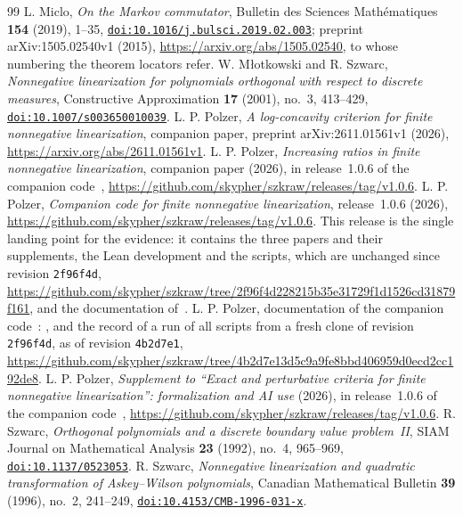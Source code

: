 \begin{thebibliography}{99}
 L. Miclo, \emph{On the Markov commutator}, Bulletin des Sciences Math\'ematiques \textbf{154} (2019), 1--35, \href{https://doi.org/10.1016/j.bulsci.2019.02.003}{\nolinkurl{doi:10.1016/j.bulsci.2019.02.003}}; preprint arXiv:1505.02540v1 (2015), \url{https://arxiv.org/abs/1505.02540}, to whose numbering the theorem locators refer.
 W. M{\l}otkowski and R. Szwarc, \emph{Nonnegative linearization for polynomials orthogonal with respect to discrete measures}, Constructive Approximation \textbf{17} (2001), no.~3, 413--429, \href{https://doi.org/10.1007/s003650010039}{\nolinkurl{doi:10.1007/s003650010039}}.
 L. P. Polzer, \emph{A log-concavity criterion for finite nonnegative linearization}, companion paper, preprint arXiv:2611.01561v1 (2026), \url{https://arxiv.org/abs/2611.01561v1}.
 L. P. Polzer, \emph{Increasing ratios in finite nonnegative linearization}, companion paper (2026), in release~1.0.6 of the companion code~\cite{code}, \url{https://github.com/skypher/szkraw/releases/tag/v1.0.6}.
 L. P. Polzer, \emph{Companion code for finite nonnegative linearization}, release~1.0.6 (2026), \url{https://github.com/skypher/szkraw/releases/tag/v1.0.6}. This release is the single landing point for the evidence: it contains the three papers and their supplements, the Lean development and the scripts, which are unchanged since revision \texttt{2f96f4d}, \url{https://github.com/skypher/szkraw/tree/2f96f4d228215b35e31729f1d1526cd31879f161}, and the documentation of~\cite{docs}.
 L. P. Polzer, documentation of the companion code~\cite{code}: ,  and the record  of a run of all scripts from a fresh clone of revision \texttt{2f96f4d}, as of revision \texttt{4b2d7e1}, \url{https://github.com/skypher/szkraw/tree/4b2d7e13d5c9a9fe8bbd406959d0ecd2cc192de8}.
 L. P. Polzer, \emph{Supplement to ``Exact and perturbative criteria for finite nonnegative linearization'': formalization and AI use} (2026), in release~1.0.6 of the companion code~\cite{code}, \url{https://github.com/skypher/szkraw/releases/tag/v1.0.6}.
 R. Szwarc, \emph{Orthogonal polynomials and a discrete boundary value problem~II}, SIAM Journal on Mathematical Analysis \textbf{23} (1992), no.~4, 965--969, \href{https://doi.org/10.1137/0523053}{\nolinkurl{doi:10.1137/0523053}}.
 R. Szwarc, \emph{Nonnegative linearization and quadratic transformation of Askey--Wilson polynomials}, Canadian Mathematical Bulletin \textbf{39} (1996), no.~2, 241--249, \href{https://doi.org/10.4153/CMB-1996-031-x}{\nolinkurl{doi:10.4153/CMB-1996-031-x}}.

\end{thebibliography}
